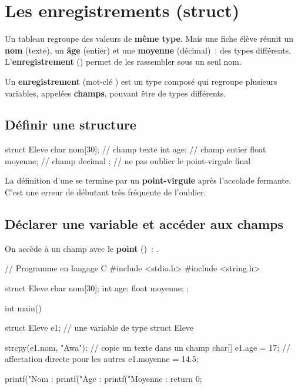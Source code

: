 \section{Les enregistrements (struct)}

Un tableau regroupe des valeurs de \textbf{même type}. Mais une fiche élève réunit
un \textbf{nom} (texte), un \textbf{âge} (entier) et une \textbf{moyenne} (décimal)~:
des types différents. L'\textbf{enregistrement} () permet de les
rassembler sous un seul nom.

\begin{definition}
Un \textbf{enregistrement} (mot-clé ) est un type composé qui regroupe
plusieurs variables, appelées \textbf{champs}, pouvant être de types différents.
\end{definition}

\subsection{Définir une structure}

\begin{codec}
struct Eleve {
    char nom[30];       // champ texte
    int age;            // champ entier
    float moyenne;      // champ decimal
};                      // ne pas oublier le point-virgule final
\end{codec}

\begin{attention}
La définition d'une  se termine par un \textbf{point-virgule} après
l'accolade fermante. C'est une erreur de débutant très fréquente de l'oublier.
\end{attention}

\subsection{Déclarer une variable et accéder aux champs}

On accède à un champ avec le \textbf{point} ()~: .

\begin{codec}
// Programme en langage C
#include <stdio.h>
#include <string.h>

struct Eleve {
    char nom[30];
    int age;
    float moyenne;
};

int main() {
    struct Eleve e1;            // une variable de type struct Eleve

    strcpy(e1.nom, "Awa");      // copie un texte dans un champ char[]
    e1.age = 17;                // affectation directe pour les autres
    e1.moyenne = 14.5;

    printf("Nom     : %
    printf("Age     : %
    printf("Moyenne : %
    return 0;
}
\end{codec}

